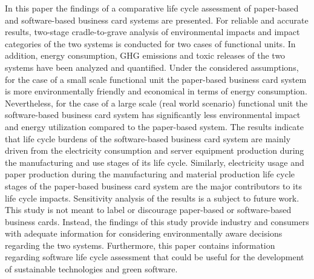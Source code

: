 \documentclass[3p,times,procedia]{elsarticle}
\begin{document}
In this paper the findings of a comparative life cycle assessment of paper-based and software-based business card systems are presented. For reliable and accurate results, two-stage cradle-to-grave analysis of environmental impacts and impact categories of the two systems is conducted for two cases of functional units. In addition, energy consumption, GHG emissions and toxic releases of the two systems have been analyzed and quantified. Under the considered assumptions, for the case of a small scale functional unit the paper-based business card system is more environmentally friendly and economical in terms of energy consumption. Nevertheless, for the case of a large scale (real world scenario) functional unit the software-based business card system has significantly less environmental impact and energy utilization compared to the paper-based system. The results indicate that life cycle burdens of the software-based business card system are mainly driven from
the electricity consumption and server equipment production
during the manufacturing and use stages of its life cycle. Similarly, electricity usage and paper production during the manufacturing and material production life cycle stages of the paper-based business card system are the major contributors to its life cycle impacts. Sensitivity analysis of the results is a subject to future work. This study is not meant to label or discourage paper-based or software-based business cards. Instead, the findings of this study provide industry and consumers with adequate information for considering environmentally aware decisions
regarding the two systems. Furthermore, this paper contains information regarding software life cycle assessment that could be useful for the development of sustainable technologies and green software. 

\end{document}

